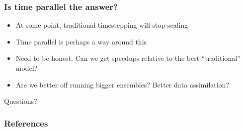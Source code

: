 \documentclass[presentation]{beamer}
\begin{document}
\begin{frame}
  \frametitle{Is time parallel the answer?}
  \begin{itemize}
  \item At some point, traditional timestepping will stop scaling
  \item Time parallel is perhaps a way around this
  \item Need to be honest.  Can we get speedups relative to the best
    ``traditional'' model?
  \item Are we better off running bigger ensembles?  Better data
    assimilation?
  \end{itemize}
\end{frame}

\begin{frame}[standout]
  Questions?
\end{frame}

\appendix

\begin{frame}[allowframebreaks]
  \frametitle{References}
  
  \printbibliography[heading=none]
\end{frame}
\end{document}
